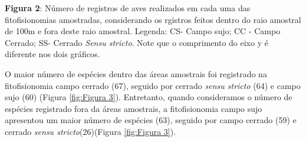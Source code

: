 \textbf{Figura 2}: Número de registros de aves realizados em cada uma das fitofisionomias amostradas, considerando os rgistros feitos dentro do raio amostral de 100m e fora deste raio amostral. Legenda: CS- Campo sujo; CC -  Campo Cerrado; SS- Cerrado \textit{Sensu stricto}. Note que o comprimento do eixo y é diferente nos dois gráficos.

O maior número de espécies dentro das áreas amostrais foi registrado na fitofisionomia campo cerrado (67), seguido por cerrado \textit{sensu stricto} (64) e campo sujo (60) (Figura \ref{fig:Figura 3}). Entretanto, quando consideramos o número de espécies registrado fora da áreas amostrais, a fitofisionomia campo sujo apresentou um maior número de espécies (63), seguido por campo cerrado (59) e cerrado \textit{sensu stricto}(26)(Figura \ref{fig:Figura 3}).
